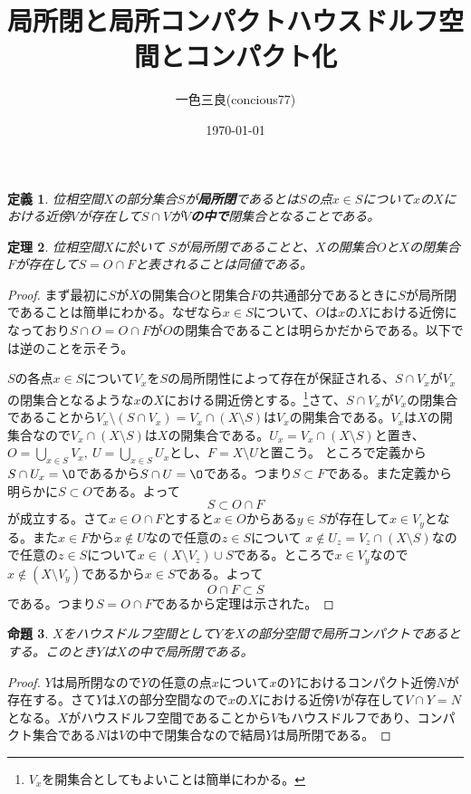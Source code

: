 \documentclass[leqno]{jsarticle}
\title{局所閉と局所コンパクトハウスドルフ空間とコンパクト化}
\author{一色三良(concious77)}
\date{\today}
\newtheorem{thm}{定理}
\newtheorem{prop}[thm]{命題}
\newtheorem{df}[thm]{定義}
\newcommand{\dpst}{\displaystyle}
\begin{document}
\maketitle



\begin{df}
位相空間$X$の部分集合$S$が\textbf{局所閉}であるとは$S$の点$x\in S$について$x$の$X$における近傍$V$が存在して$S\cap V$が\textbf{$V$の中で}閉集合となることである。
\end{df}

\begin{thm}\label{1}位相空間$X$に於いて
$S$が局所閉であることと、$X$の開集合$O$と$X$の閉集合$F$が存在して$S=O\cap F$と表されることは同値である。
\end{thm}
\begin{proof}
まず最初に$S$が$X$の開集合$O$と閉集合$F$の共通部分であるときに$S$が局所閉であることは簡単にわかる。なぜなら$x\in S$について、$O$は$x$の$X$における近傍になっており$S\cap O=O\cap F$が$O$の閉集合であることは明らかだからである。以下では逆のことを示そう。\par
$S$の各点$x\in S$について$V_x$を$S$の局所閉性によって存在が保証される、$S\cap V_x$が$V_x$の閉集合となるような$x$の$X$における開近傍とする。\footnote{$V_x$を開集合としてもよいことは簡単にわかる。}さて、$S\cap V_x$が$V_x$の閉集合であることから$V_x\setminus(S\cap V_x)=V_x\cap (X\setminus S)$は$V_x$の開集合である。$V_x$は$X$の開集合なので$V_x\cap (X\setminus S)$は$X$の開集合である。$U_x=V_x\cap (X\setminus S)$と置き、$\dpst O=\bigcup_{x\in S}V_x,\ U=\bigcup_{x\in S}U_x$とし、$F=X\setminus U$と置こう。
ところで定義から$S\cap U_x=\O$であるから$S\cap U=\O$である。つまり$S\subset F$である。また定義から明らかに$S\subset O$である。よって
\[
S\subset O\cap F
\]
が成立する。さて$x\in O\cap F$とすると$x\in O$からある$y\in S$が存在して$x\in V_y$となる。また$x\in F$から$x\not\in U$なので任意の$z\in S$について $x\not\in U_z=V_z\cap(X\setminus S)$なので任意の$z\in S$について$x\in (X\setminus V_z)\cup S$である。ところで$x\in V_y$なので$x\not\in (X\setminus V_y)$であるから$x\in S$である。よって
\[
O\cap F\subset S
\]
である。つまり$S=O\cap F$であるから定理は示された。
\end{proof}


\begin{prop}\label{2}
$X$をハウスドルフ空間として$Y$を$X$の部分空間で局所コンパクトであるとする。このとき$Y$は$X$の中で局所閉である。
\end{prop}
\begin{proof}
$Y$は局所閉なので$Y$の任意の点$x$について$x$の$Y$におけるコンパクト近傍$N$が存在する。さて$Y$は$X$の部分空間なので$x$の$X$における近傍$V$が存在して$V\cap Y=N$となる。$X$がハウスドルフ空間であることから$V$もハウスドルフであり、コンパクト集合である$N$は$V$の中で閉集合なので結局$Y$は局所閉である。
\end{proof}
\end{document}
